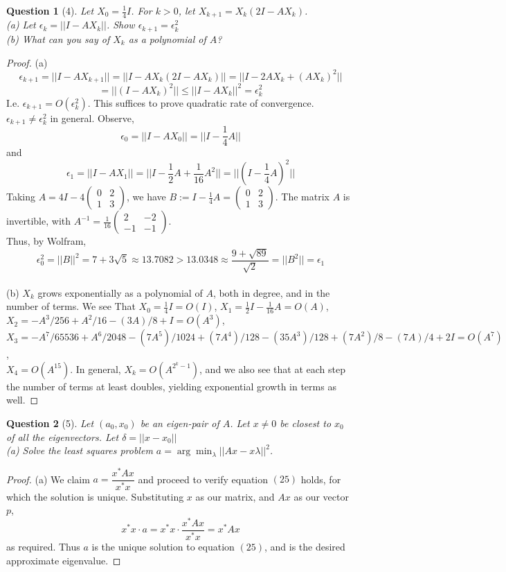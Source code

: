 \documentclass[11pt]{article}
\theoremstyle{quest}
\newtheorem*{question}{Question}
\begin{document}
\begin{question}[4]
Let $X_0 = \frac{1}{4}I$. For $k > 0$, let $X_{k+1} = X_k(2I - AX_k)$.
\\(a) Let $\epsilon_k = ||I - AX_k||$. Show $\epsilon_{k+1} = \epsilon_k^2$
\\(b) What can you say of $X_k$ as a polynomial of $A$?
\end{question}
\begin{proof}
(a) $$\epsilon_{k+1} = ||I - AX_{k+1}|| = ||I - AX_k(2I-AX_k)|| = ||I - 2AX_k + (AX_k)^2||$$ $$= ||(I - AX_k)^2|| \le ||I - AX_k||^2 = \epsilon_k^2$$
I.e. $\epsilon_{k+1} = O(\epsilon_k^2)$. This suffices to prove quadratic rate of convergence.
\\$\epsilon_{k+1} \ne \epsilon_k^2$ in general. Observe, $$\epsilon_0 = ||I - AX_0|| = ||I - \frac{1}{4}A||$$and$$\epsilon_1 = ||I - AX_1|| = ||I - \frac{1}{2}A + \frac{1}{16}A^2|| = ||(I - \frac{1}{4}A)^2||$$
Taking $A = 4I - 4 \begin{pmatrix}
0 & 2 \\
1 & 3
\end{pmatrix}$, we have $B := I - \frac{1}{4}A = \begin{pmatrix}
0 & 2 \\
1 & 3
\end{pmatrix}$. The matrix $A$ is invertible, with $A^{-1} = \frac{1}{16}\begin{pmatrix}
2 & -2 \\
-1 & -1
\end{pmatrix}$.
\\Thus, by Wolfram, $$\epsilon_0^2 = ||B||^2 = 7 + 3\sqrt{5} \approx 13.7082 > 13.0348 \approx \frac{9 + \sqrt{89}}{\sqrt{2}} = ||B^2|| = \epsilon_1$$
\\(b) $X_k$ grows exponentially as a polynomial of $A$, both in degree, and in the number of terms. We see That $X_0 = \frac{1}{4}I = O(I)$, $X_1 = \frac{1}{2}I - \frac{1}{16}A = O(A)$, \\$X_2 = -A^3/256 + A^2/16 - (3 A)/8 + I = O(A^3)$, \\$X_3 = -A^7/65536 + A^6/2048 - (7 A^5)/1024 + (7 A^4)/128 - (35 A^3)/128 + (7 A^2)/8 - (7 A)/4 + 2I = O(A^7)$, \\$X_4 = O(A^{15})$. In general, $X_k = O(A^{2^k-1})$, and we also see that at each step the number of terms at least doubles, yielding exponential growth in terms as well.
\end{proof}
\begin{question}[5]
Let $(a_0, x_0)$ be an eigen-pair of $A$. Let $x \ne 0$ be closest to $x_0$ of all the eigenvectors. Let $\delta = ||x - x_0||$
\\(a) Solve the least squares problem $a = \arg\min_\lambda ||Ax - x
\lambda||^2$.
\end{question}
\begin{proof}
(a) We claim $a = \dfrac{x^*Ax}{x^*x}$ and proceed to verify equation $(25)$ holds, for which the solution is unique. Substituting $x$ as our matrix, and $Ax$ as our vector $p$,
$$x^*x \cdot a = x^*x \cdot \dfrac{x^*Ax}{x^*x} = x^*Ax$$
as required. Thus $a$ is the unique solution to equation $(25)$, and is the desired approximate eigenvalue.
\end{proof}
\end{document}
